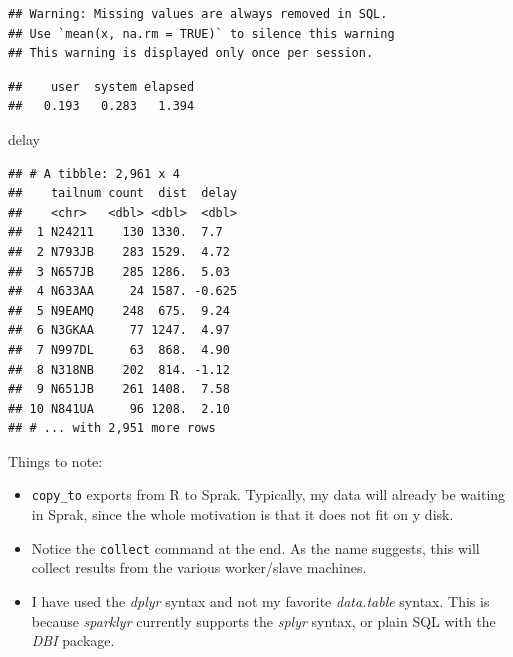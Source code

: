 \documentclass[]{book}
\newenvironment{Shaded}{\begin{snugshade}}{\end{snugshade}}
\newcommand{\DataTypeTok}[1]{\textcolor[rgb]{0.13,0.29,0.53}{#1}}
\newcommand{\DecValTok}[1]{\textcolor[rgb]{0.00,0.00,0.81}{#1}}
\newcommand{\KeywordTok}[1]{\textcolor[rgb]{0.13,0.29,0.53}{\textbf{#1}}}
\newcommand{\NormalTok}[1]{#1}
\newcommand{\OperatorTok}[1]{\textcolor[rgb]{0.81,0.36,0.00}{\textbf{#1}}}
\newcommand{\StringTok}[1]{\textcolor[rgb]{0.31,0.60,0.02}{#1}}
\providecommand{\tightlist}{%
  \setlength{\itemsep}{0pt}\setlength{\parskip}{0pt}}
\theoremstyle{definition}
\theoremstyle{definition}
\theoremstyle{definition}
\theoremstyle{remark}
\begin{document}
\begin{Shaded}
\end{Shaded}

\begin{verbatim}
## Warning: Missing values are always removed in SQL.
## Use `mean(x, na.rm = TRUE)` to silence this warning
## This warning is displayed only once per session.
\end{verbatim}

\begin{verbatim}
##    user  system elapsed 
##   0.193   0.283   1.394
\end{verbatim}

\begin{Shaded}
\begin{Highlighting}[]
\NormalTok{delay}
\end{Highlighting}
\end{Shaded}

\begin{verbatim}
## # A tibble: 2,961 x 4
##    tailnum count  dist  delay
##    <chr>   <dbl> <dbl>  <dbl>
##  1 N24211    130 1330.  7.7  
##  2 N793JB    283 1529.  4.72 
##  3 N657JB    285 1286.  5.03 
##  4 N633AA     24 1587. -0.625
##  5 N9EAMQ    248  675.  9.24 
##  6 N3GKAA     77 1247.  4.97 
##  7 N997DL     63  868.  4.90 
##  8 N318NB    202  814. -1.12 
##  9 N651JB    261 1408.  7.58 
## 10 N841UA     96 1208.  2.10 
## # ... with 2,951 more rows
\end{verbatim}

Things to note:

\begin{itemize}
\tightlist
\item
  \texttt{copy\_to} exports from R to Sprak. Typically, my data will already be waiting in Sprak, since the whole motivation is that it does not fit on y disk.
\item
  Notice the \texttt{collect} command at the end. As the name suggests, this will collect results from the various worker/slave machines.
\item
  I have used the \emph{dplyr} syntax and not my favorite \emph{data.table} syntax. This is because \emph{sparklyr} currently supports the \emph{splyr} syntax, or plain SQL with the \emph{DBI} package.
\end{itemize}
\end{document}
